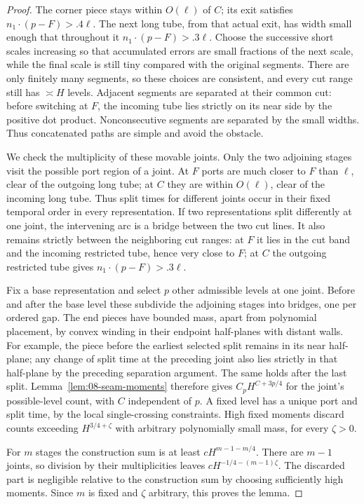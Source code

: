 \begin{proof}
The corner piece stays within \(O(\ell)\) of \(C\); its exit satisfies
\(n_1\cdot(p-F)>.4\ell\).  The next long tube, from that actual
exit, has width small enough that throughout it
\(n_1\cdot(p-F)>.3\ell\).  Choose the successive short scales
increasing so that accumulated errors are small fractions of the next
scale, while the final scale is still tiny compared with the original
segments.  There are only finitely many segments, so these choices are
consistent, and every cut range still has \(\asymp H\) levels.
Adjacent segments are separated at their common cut: before switching
at \(F\), the incoming tube lies strictly on its near side by the
positive dot product.  Nonconsecutive segments are separated by the
small widths.  Thus concatenated paths are simple and avoid the obstacle.

We check the multiplicity of these movable joints.  Only the two
adjoining stages visit the possible port region of a joint.  At \(F\)
ports are much closer to \(F\) than \(\ell\), clear of the outgoing
long tube; at \(C\) they are within \(O(\ell)\), clear of the incoming
long tube.  Thus split times for different joints occur in their fixed
temporal order in every representation.  If two representations split
differently at one joint, the intervening arc is a bridge between the
two cut lines.  It also remains strictly between the neighboring cut
ranges: at \(F\) it lies in the cut band and the incoming restricted
tube, hence very close to \(F\); at \(C\) the outgoing restricted
tube gives \(n_1\cdot(p-F)>.3\ell\).

Fix a base representation and select \(p\) other admissible levels
at one joint.  Before and after the base level these subdivide the
adjoining stages into bridges, one per ordered gap.  The end pieces
have bounded mass, apart from polynomial placement, by convex winding
in their endpoint half-planes with distant walls.  For example, the
piece before the earliest selected split remains in its near half-plane;
any change of split time at the preceding joint also lies strictly in
that half-plane by the preceding separation argument.  The same holds
after the last split.  Lemma~\ref{lem:08-seam-moments} therefore gives
\(C_pH^{C+3p/4}\) for the joint's possible-level count, with \(C\)
independent of \(p\).  A fixed level has a unique port and split time,
by the local single-crossing constraints.  High fixed moments discard
counts exceeding \(H^{3/4+\zeta}\) with arbitrary polynomially small
mass, for every \(\zeta>0\).

For \(m\) stages the construction sum is at least
\(cH^{m-1-m/4}\).  There are \(m-1\) joints, so division by their
multiplicities leaves
\(cH^{-1/4-(m-1)\zeta}\).  The discarded part is negligible relative
to the construction sum by choosing sufficiently high moments.  Since
\(m\) is fixed and \(\zeta\) arbitrary, this proves the lemma.
\end{proof}

